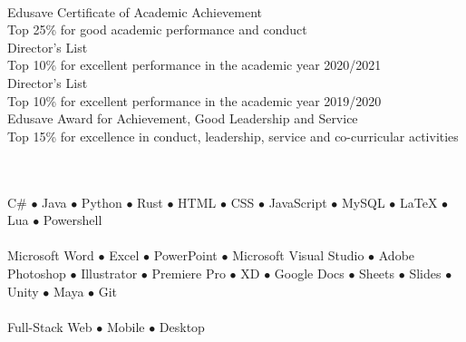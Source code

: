 \documentclass[a4paper,10pt]{article}
\begin{document}
\begin{paracol}{2}
\begin{leftcolumn}
      \Large\noindent{}
      \vspace{0.15cm}\\
      \normalsize{} 
      \small\latobold Edusave Certificate of Academic Achievement\\
      \small\lato Top 25\% for good academic performance and conduct\\
      \normalsize{} 
      \small\latobold Director's List\\
      \small\lato Top 10\% for excellent performance in the academic year 2020/2021\\
      \normalsize{} 
      \small\latobold Director's List\\
      \small\lato Top 10\% for excellent performance in the academic year 2019/2020\\
      \normalsize{} 
      \small\latobold Edusave Award for Achievement, Good Leadership and Service\\
      \small\lato Top 15\% for excellence in conduct, leadership, service and co-curricular activities

      \vspace{0.35cm}

      \Large\noindent{}
      \vspace{0.15cm}\\
      \normalsize{}\\
      \small\lato
      C\# $\bullet$ Java $\bullet$ Python $\bullet$ Rust $\bullet$ HTML $\bullet$ CSS $\bullet$ JavaScript $\bullet$ MySQL $\bullet$ LaTeX $\bullet$ Lua $\bullet$ Powershell
      \vspace{0.35cm}\\
      \normalsize{}\\ 
      \small\lato
      Microsoft Word $\bullet$ Excel $\bullet$ PowerPoint $\bullet$ Microsoft Visual Studio $\bullet$ Adobe Photoshop $\bullet$ Illustrator $\bullet$ Premiere Pro $\bullet$ XD $\bullet$ Google Docs $\bullet$ Sheets $\bullet$ Slides  $\bullet$ Unity $\bullet$ Maya $\bullet$ Git
      \vspace{0.35cm}\\
      \normalsize{}\\
      \small\lato
      Full-Stack Web $\bullet$ Mobile $\bullet$ Desktop
    \end{leftcolumn}
    

\end{paracol}
\end{document}
